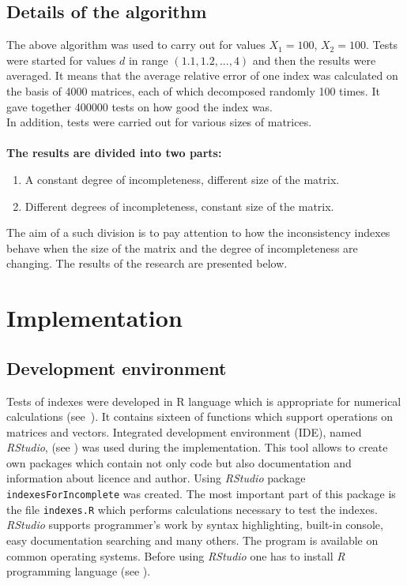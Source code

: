 \subsection{Details of the algorithm}
\label{sec:details}
The above algorithm was used to carry out for values $X_{1}=100$, $X_{2}=100$. Tests were started for values $d$ in range $\left(1.1,1.2,...,4\right)$ and then the results were averaged. It means that the average relative error of one index was calculated on the basis of 4000 matrices, each of which decomposed randomly 100 times. It gave together 400000 tests on how good the index was. 
\\
In addition, tests were carried out for various sizes of matrices.
\\
\\
\textbf{The results are divided into two parts:}
\begin{enumerate}
  \item A constant degree of incompleteness, different size of the matrix.
  \item Different degrees of incompleteness, constant size of the matrix.
\end{enumerate}

The aim of a such division is to pay attention to how the inconsistency indexes behave when the size of the matrix and the degree of incompleteness are changing. The results of the research are presented below.


\section{Implementation}

\subsection{Development environment}
Tests of indexes were developed in R language which is appropriate for numerical calculations (see~\cite{projectR}). It contains sixteen of functions which support operations on matrices and vectors. Integrated development environment (IDE), named \textit{RStudio}, (see \cite{studioR}) was used during the implementation. This tool allows to create own packages which contain not only code but also documentation and information about licence and author. Using \textit{RStudio} package \texttt{indexesForIncomplete} was created. The most important part of this package is the file \texttt{indexes.R} which performs calculations necessary to test the indexes. \textit{RStudio} supports programmer's work by syntax highlighting, built-in console, easy documentation searching and many others. The program is available on common operating systems. Before using \textit{RStudio} one has to install \textit{R} programming language (see \cite{installR}).  



